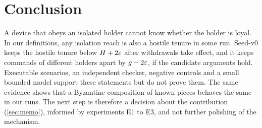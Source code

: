 \section{Conclusion}
\label{sec:conclusion}

A device that obeys an isolated holder cannot know whether the holder is loyal. In our
definitions, any isolation reach is also a hostile tenure in some run. Seed-v0 keeps the
hostile tenure below $H + 2\varepsilon$ after withdrawals take effect, and it keeps commands of
different holders apart by $g - 2\varepsilon$, if the candidate arguments hold. Executable
scenarios, an independent checker, negative controls and a small bounded model support
these statements but do not prove them. The same evidence shows that a Byzantine
composition of known pieces behaves the same in our runs. The next step is therefore a
decision about the contribution (\cref{sec:memo}), informed by experiments E1 to E3, and
not further polishing of the mechanism.
